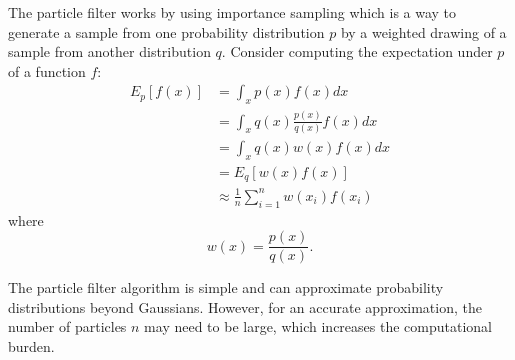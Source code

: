 \documentclass{article}
\begin{document}
The particle filter works by using importance sampling which is a way to generate a sample from one probability distribution $p$ by a weighted drawing of a sample from another distribution $q$.  Consider computing the expectation under $p$ of a function $f$:
\begin{align}
E_p[f(x)] &= \int_x p(x) f(x) dx \\
&= \int_x  q(x) \frac{p(x)}{q(x)} f(x) dx \\
&= \int_x  q(x) w(x) f(x) dx \\
&= E_q[w(x)f(x)] \\
&\approx \frac{1}{n} \sum_{i=1}^n w(x_i) f(x_i)
\end{align}
where
\begin{equation}
w(x) = \frac{p(x)}{q(x)}.
\end{equation}

The particle filter algorithm is simple and can approximate probability distributions beyond Gaussians.  However, for an accurate approximation, the number of particles $n$ may need to be large, which increases the computational burden.



\nocite{*}
\end{document}
